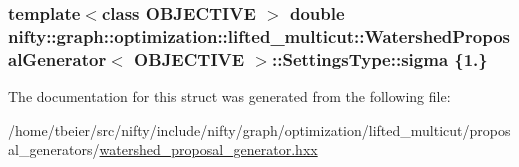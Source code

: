 \subsubsection[{sigma}]{\setlength{\rightskip}{0pt plus 5cm}template$<$class O\+B\+J\+E\+C\+T\+I\+V\+E $>$ double {\bf nifty\+::graph\+::optimization\+::lifted\+\_\+multicut\+::\+Watershed\+Proposal\+Generator}$<$ O\+B\+J\+E\+C\+T\+I\+V\+E $>$\+::Settings\+Type\+::sigma \{1.\}}\label{structnifty_1_1graph_1_1optimization_1_1lifted__multicut_1_1WatershedProposalGenerator_1_1SettingsType_a209bf4f5f2b73b32e46e2c0267fd20aa}


The documentation for this struct was generated from the following file\+:\begin{DoxyCompactItemize}
\item 
/home/tbeier/src/nifty/include/nifty/graph/optimization/lifted\+\_\+multicut/proposal\+\_\+generators/\hyperlink{lifted__multicut_2proposal__generators_2watershed__proposal__generator_8hxx}{watershed\+\_\+proposal\+\_\+generator.\+hxx}\end{DoxyCompactItemize}
